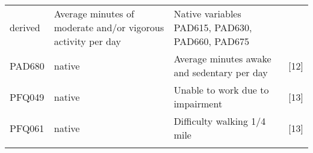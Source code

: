 \documentclass[]{article}
\begin{document}
\begin{longtable}[]{@{}llll@{}}
\begin{minipage}[t]{0.05\columnwidth}
derived\strut
\end{minipage} & \begin{minipage}[t]{0.43\columnwidth}\raggedright
Average minutes of moderate and/or vigorous activity per day\strut
\end{minipage} & \begin{minipage}[t]{0.31\columnwidth}\raggedright
Native variables PAD615, PAD630, PAD660, PAD675\strut
\end{minipage}\tabularnewline
\begin{minipage}[t]{0.10\columnwidth}\raggedright
PAD680\strut
\end{minipage} & \begin{minipage}[t]{0.05\columnwidth}\raggedright
native\strut
\end{minipage} & \begin{minipage}[t]{0.43\columnwidth}\raggedright
Average minutes awake and sedentary per day\strut
\end{minipage} & \begin{minipage}[t]{0.31\columnwidth}\raggedright
{[}12{]}\strut
\end{minipage}\tabularnewline
\begin{minipage}[t]{0.10\columnwidth}\raggedright
PFQ049\strut
\end{minipage} & \begin{minipage}[t]{0.05\columnwidth}\raggedright
native\strut
\end{minipage} & \begin{minipage}[t]{0.43\columnwidth}\raggedright
Unable to work due to impairment\strut
\end{minipage} & \begin{minipage}[t]{0.31\columnwidth}\raggedright
{[}13{]}\strut
\end{minipage}\tabularnewline
\begin{minipage}[t]{0.10\columnwidth}\raggedright
PFQ061\strut
\end{minipage} & \begin{minipage}[t]{0.05\columnwidth}\raggedright
native\strut
\end{minipage} & \begin{minipage}[t]{0.43\columnwidth}\raggedright
Difficulty walking 1/4 mile\strut
\end{minipage} & \begin{minipage}[t]{0.31\columnwidth}\raggedright
{[}13{]}\strut
\end{minipage}\tabularnewline
\begin{minipage}[t]{0.10\columnwidth}\raggedright

\end{minipage}
\end{longtable}
\end{document}
